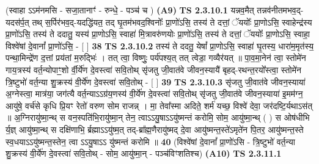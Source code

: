 \documentclass[17pt]{extarticle}
\begin{document}
                      (स्वाहा ऽऽम॑नमसि - सजा॒तानाꣳ॑ - रुन्धे॒ - पञ्च॑ च )  \textbf{(A9)} \newline \newline
                                        \textbf{ TS 2.3.10.1} \newline
                  यन्नव॒मैत् तन्नव॑नीतमभव॒द्-यदस॑र्प॒त् तथ् स॒र्पिर॑भव॒द्-यदद्धि॑यत॒ तद् घृ॒तम॑भवद॒श्विनोः᳚ प्रा॒णो॑ऽसि॒ तस्य॑ ते दत्तां॒ ॅययोः᳚ प्रा॒णोऽसि॒ स्वाहेन्द्र॑स्य प्रा॒णो॑ऽसि॒ तस्य॑ ते ददातु॒ यस्य॑ प्रा॒णोऽसि॒ स्वाहा॑ मि॒त्रावरु॑णयोः प्रा॒णो॑ऽसि॒ तस्य॑ ते दत्तां॒ ॅययोः᳚ प्रा॒णोऽसि॒ स्वाहा॒ विश्वे॑षां दे॒वानां᳚ प्रा॒णो॑ऽसि॒ - [  ] \textbf{  38} \newline
                  \newline
                                \textbf{ TS 2.3.10.2} \newline
                  तस्य॑ ते ददतु॒ येषां᳚ प्रा॒णोऽसि॒ स्वाहा॑ घृ॒तस्य॒ धारा॑म॒मृत॑स्य॒ पन्था॒मिन्द्रे॑ण द॒त्तां प्रय॑तां म॒रुद्भिः॑ । तत् त्वा॒ विष्णुः॒ पर्य॑पश्य॒त् तत् त्वेडा॒ गव्यैर॑यत् ॥ पा॒व॒मा॒नेन॑ त्वा॒ स्तोमे॑न गाय॒त्रस्य॑ वर्त॒न्योपाꣳ॒॒शो र्वी॒र्ये॑ण दे॒वस्त्वा॑ सवि॒तोथ् सृ॑जतु जी॒वात॑वे जीवन॒स्यायै॑ बृहद्-रथन्त॒रयो᳚स्त्वा॒ स्तोमे॑न त्रि॒ष्टुभो॑ वर्त॒न्या शु॒क्रस्य॑ वी॒र्ये॑ण दे॒वस्त्वा॑ सवि॒तोथ् - [  ] \textbf{  39} \newline
                  \newline
                                \textbf{ TS 2.3.10.3} \newline
                  सृ॑जतु जी॒वात॑वे जीवन॒स्याया॑ अ॒ग्नेस्त्वा॒ मात्र॑या॒ जग॑त्यै वर्त॒न्याऽऽग्र॑य॒णस्य॑ वी॒र्ये॑ण दे॒वस्त्वा॑ सवि॒तोथ् सृ॑जतु जी॒वात॑वे जीवन॒स्याया॑ इ॒मम॑ग्न॒ आयु॑षे॒ वर्च॑से कृधि प्रि॒यꣳ रेतो॑ वरुण सोम राजन्न् । मा॒ तेवा᳚स्मा अदिते॒ शर्म॑ यच्छ॒ विश्वे॑ देवा॒ जर॑दष्टि॒र्यथाऽस॑त् ॥ अ॒ग्निरायु॑ष्मा॒न्थ् स वन॒स्पति॑भि॒रायु॑ष्मा॒न् तेन॒ त्वाऽऽयु॒षाऽऽयु॑ष्मन्तं करोमि॒ सोम॒ आयु॑ष्मा॒न्थ् ( ) स ओष॑धीभि र्य॒ज्ञ् आयु॑ष्मा॒न्थ् स दक्षि॑णाभि॒ र्ब्रह्माऽऽयु॑ष्म॒त् तद्-ब्रा᳚ह्म॒णैरायु॑ष्मद् दे॒वा आयु॑ष्मन्त॒स्ते॑ऽमृते॑न पि॒तर॒ आयु॑ष्मन्त॒स्ते स्व॒धयाऽऽयु॑ष्मन्त॒स्तेन॒ त्वा ऽऽयु॒षाऽऽ यु॑ष्मन्तं करोमि ॥ \textbf{  40} \newline
                  \newline
                      (विश्वे॑षां दे॒वानां᳚ प्रा॒णो॑ऽसि - त्रि॒ष्टुभो॑ वर्त॒न्या शु॒क्रस्य॑ वी॒र्ये॑ण दे॒वस्त्वा॑ सवि॒तोथ् - सोम॒ आयु॑ष्मा॒न् - पञ्च॑विꣳशतिश्च)  \textbf{(A10)} \newline \newline
                                        \textbf{ TS 2.3.11.1} \newline
\end{document}
